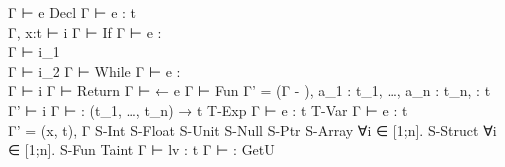 {{             { Γ ⊢ e }
         }
    {Decl}{ 
              { Γ ⊢ e : t
             \\ Γ, x:t ⊢ i
              }
              { Γ ⊢  }
          }
    {If}{ 
            { Γ ⊢ e : \tInt \\
              Γ ⊢ i_1 \\
              Γ ⊢ i_2
            }
            { Γ ⊢  }
        }
    {While}{ 
               { Γ ⊢ e : \tInt \\
                 Γ ⊢ i
               }
               { Γ ⊢  }
           }
    {Return}{ 
                { Γ ⊢ \vRet ← e }
                { Γ ⊢  }
            }
    {Fun}{ 
             { Γ' = (Γ - \vRet),
                     a_1 : t_1,
                     …,
                     a_n : t_n,
                     \vRet : t \\
               Γ' ⊢ i
             }
             { Γ ⊢ 
                    : (t_1, …, t_n) → t
             }
         }
    {T-Exp}{ 
                { Γ ⊢ e : t }
                {  }
            }
    {T-Var}{ 
                { Γ ⊢ e : t \\
                  Γ' = (x, t), Γ
                }
                {  }
            }
    {S-Int}{ 
               { }
               {}
           }
    {S-Float}{ 
                 { }
                 {}
    }
    {S-Unit}{ 
                { }
                {}
    }
    {S-Null}{ 
                { }
                {}
    }
    {S-Ptr}{ 
               {}
               {}
    }
    {S-Array}{ 
                 { ∀i ∈ [1;n]. }
                 {  }
    }
    {S-Struct}{ 
                  { ∀i ∈ [1;n].  }
                  { 
                                        {  }
                  }
    }
    {S-Fun}{ 
               { }
               {}
    }
    {Taint}{ 
                 { Γ ⊢ lv : t }
                 { Γ ⊢  :  }
    }
    {GetU}{ 
}}

